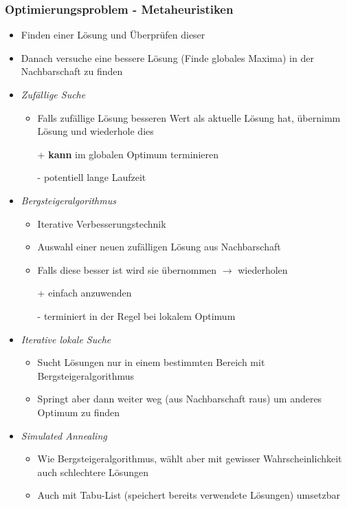        \subsubsection{Optimierungsproblem - Metaheuristiken}
            \begin{itemize}
                \item Finden einer Lösung und Überprüfen dieser
                \item Danach versuche eine bessere Lösung (Finde globales Maxima) in der Nachbarschaft zu finden
                \item \textit{Zufällige Suche}
                    \begin{itemize}
                        \item Falls zufällige Lösung besseren Wert als aktuelle Lösung hat, übernimm Lösung und wiederhole dies
                        \item[+] \textbf{kann} im globalen Optimum terminieren
                        \item[-] potentiell lange Laufzeit 
                    \end{itemize}
                \item \textit{Bergsteigeralgorithmus}
                    \begin{itemize}
                        \item Iterative Verbesserungstechnik
                        \item Auswahl einer neuen zufälligen Lösung aus Nachbarschaft
                        \item Falls diese besser ist wird sie übernommen $\rightarrow$ wiederholen
                        \item[+] einfach anzuwenden
                        \item[-] terminiert in der Regel bei lokalem Optimum 
                    \end{itemize}

                \item \textit{Iterative lokale Suche}
                    \begin{itemize}
                        \item Sucht Lösungen nur in einem bestimmten Bereich mit Bergsteigeralgorithmus
                        \item Springt aber dann weiter weg (aus Nachbarschaft raus) um anderes Optimum zu finden
                    \end{itemize}
\pagebreak
                \item \textit{Simulated Annealing}
                    \begin{itemize}
                        \item Wie Bergsteigeralgorithmus, wählt aber mit gewisser Wahrscheinlichkeit auch schlechtere Lösungen
                        \item Auch mit Tabu-List (speichert bereits verwendete Lösungen) umsetzbar
                    \end{itemize}


\end{itemize}
